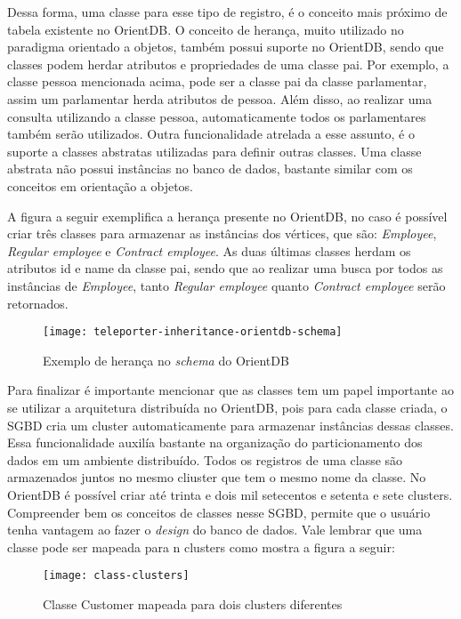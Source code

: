 	Dessa forma, uma classe para esse tipo de registro, é o conceito mais próximo de tabela existente no OrientDB. O conceito de herança, muito utilizado no paradigma orientado a objetos, também possui suporte no OrientDB, sendo que classes podem herdar atributos e propriedades de uma classe pai. Por exemplo, a classe pessoa mencionada acima, pode ser a classe pai da classe parlamentar, assim um parlamentar herda atributos de pessoa. Além disso, ao realizar uma consulta utilizando a classe pessoa, automaticamente todos os parlamentares também serão utilizados. Outra funcionalidade atrelada a esse assunto, é o suporte a classes abstratas utilizadas para definir outras classes. Uma classe abstrata não possui instâncias no banco de dados, bastante similar com os conceitos em orientação a objetos. 
	
	A figura a seguir exemplifica a herança presente no OrientDB, no caso é possível criar três classes para armazenar as instâncias dos vértices, que são: \textit{Employee}, \textit{Regular employee} e \textit{Contract employee}. As duas últimas classes herdam os atributos id e name da classe pai, sendo que ao realizar uma busca por todos as instâncias de \textit{Employee}, tanto \textit{Regular employee} quanto \textit{Contract employee} serão retornados.
	
\begin{figure}[h]
	\centering
    \texttt{[image: teleporter-inheritance-orientdb-schema]}
    \caption{Exemplo de herança no \textit{schema} do OrientDB }
    \label{fig:inheritance-orient}
\end{figure}
	
	Para finalizar é importante mencionar que as classes tem um papel importante ao se utilizar a arquitetura distribuída no OrientDB, pois para cada classe criada, o SGBD cria um cluster automaticamente para armazenar instâncias dessas classes. Essa funcionalidade auxilía bastante na organização do particionamento dos dados em um ambiente distribuído. Todos os registros de uma classe são armazenados juntos no mesmo cliuster que tem o mesmo nome da classe. No OrientDB é possível criar até trinta e dois mil setecentos e setenta e sete clusters. Compreender bem os conceitos de classes nesse SGBD, permite que o usuário tenha vantagem ao fazer o \textit{design} do banco de dados. Vale lembrar que uma classe pode ser mapeada para n clusters como mostra a figura a seguir:
\begin{figure}[h]
	\centering
    \texttt{[image: class-clusters]}
    \caption{Classe Customer mapeada para dois clusters diferentes}
    \label{fig:class-cluster}
\end{figure}

